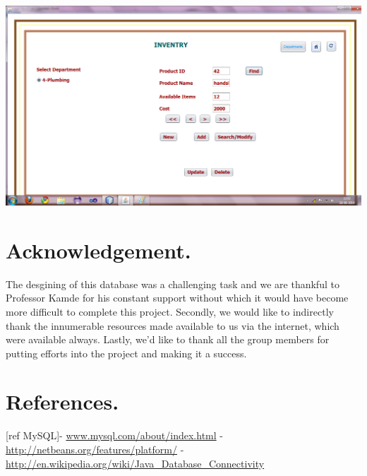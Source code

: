 \documentclass[12pt,a4paper]{report}
\begin{document}
\begin{center}
\includegraphics[scale=0.45]{19_2.png}
\end{center}


\chapter{Acknowledgement.}%
The desgining of this database was a challenging task and we are thankful to Professor Kamde for his constant support without which it would have become more difficult to complete this project. Secondly, we would like to indirectly thank the innumerable resources made available to us via the internet, which were available always. Lastly, we'd like to thank all the group members for putting efforts into the project and making it a success.

\chapter{References.}%
[ref MySQL]- \url{www.mysql.com/about/index.html}
- \url{http://netbeans.org/features/platform/}
 - \url{http://en.wikipedia.org/wiki/Java_Database_Connectivity}
\end{document}

